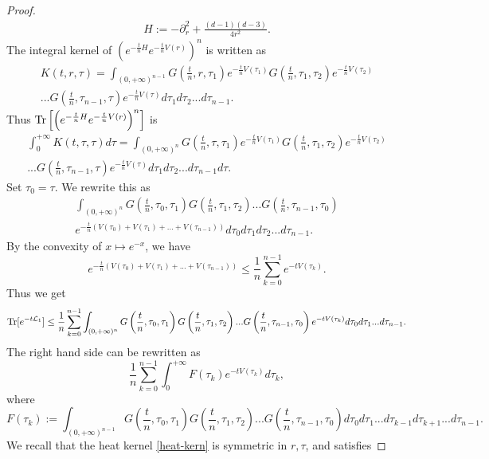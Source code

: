 \documentclass[%
11pt,  reqno]{amsart}
\theoremstyle{remarkstyle}
\newcommand{\1}{\hspace{0.2mm}\text{I}\hspace{0.2mm}}
\renewcommand{\L}{\mathcal{L}}
\numberwithin{equation}{section}
\numberwithin{theorem}{section}
\begin{document}
\begin{proof}
\begin{align}
			H:= -\partial^2_r +\frac{(d-1)(d-3)}{4r^2}.
		\end{align} 
		The integral kernel of $\left(e^{-\frac{t}{n}H} e^{-\frac{t}{n}V(r)}\right)^n$ is written as
		\begin{multline*}
			K(t,r,\tau) = \int_{(0,+\infty)^{n-1}} G\left(\frac{t}{n}, r, \tau_1\right) e^{-\frac{t}{n}V(\tau_1)} G\left(\frac{t}{n}, \tau_1, \tau_2\right)e^{-\frac{t}{n}V(\tau_2)}\\
			...G\left(\frac{t}{n}, \tau_{n-1}, \tau\right) e^{-\frac{t}{n}V(\tau)} d\tau_1 d\tau_2...d\tau_{n-1}.
		\end{multline*}
		Thus ${\rm Tr}\left[\left(e^{-\frac{t}{n}H} e^{-\frac{t}{n}V(r)}\right)^n\right]$ is
		\begin{multline*}
			\int_0^{+\infty} K(t, \tau, \tau) d\tau = \int_{(0,+\infty)^n} G\left(\frac{t}{n}, \tau, \tau_1\right) e^{-\frac{t}{n}V(\tau_1)} G\left(\frac{t}{n}, \tau_1, \tau_2\right)e^{-\frac{t}{n}V(\tau_2)}\\
			...G\left(\frac{t}{n}, \tau_{n-1}, \tau\right) e^{-\frac{t}{n}V(\tau)} d\tau_1 d\tau_2...d\tau_{n-1} d\tau.
		\end{multline*}
		Set $\tau_0=\tau$. We rewrite this as
		\begin{multline*}
			\int_{(0,+\infty)^n} G\left(\frac{t}{n}, \tau_0, \tau_1\right) G\left(\frac{t}{n}, \tau_1, \tau_2\right)...G\left(\frac{t}{n}, \tau_{n-1}, \tau_0\right) \\
			e^{-\frac{t}{n}\left(V(\tau_0)+V(\tau_1)+...+V(\tau_{n-1})\right)} d\tau_0d\tau_1 d\tau_2...d\tau_{n-1}.
		\end{multline*}
		By the convexity of $x \mapsto e^{-x}$, we have
		\[
		e^{-\frac{t}{n} \left(V(\tau_0)+V(\tau_1)+...+V(\tau_{n-1})\right)} \leq \frac{1}{n} \sum_{k=0}^{n-1} e^{-tV(\tau_k)}.
		\]
		Thus we get
		\begin{align*}
			{\rm Tr}[e^{-t\L_1}] \leq \frac{1}{n} \sum_{k=0}^{n-1} \int_{(0,+\infty)^n} G\left(\frac{t}{n}, \tau_0, \tau_1\right) G\left(\frac{t}{n}, \tau_1, \tau_2\right)...G\left(\frac{t}{n}, \tau_{n-1}, \tau_0\right) e^{-tV(\tau_k)} d\tau_0d\tau_1...d\tau_{n-1}.
		\end{align*}
		The right hand side can be rewritten as
		\[
		\frac{1}{n} \sum_{k=0}^{n-1} \int_0^{+\infty} F(\tau_k)e^{-tV(\tau_k)} d\tau_k,
		\]
		where
		\[
		F(\tau_k):=\int_{(0,+\infty)^{n-1}} G\left(\frac{t}{n}, \tau_0, \tau_1\right) G\left(\frac{t}{n}, \tau_1, \tau_2\right)...G\left(\frac{t}{n}, \tau_{n-1}, \tau_0\right) d\tau_0 d\tau_1...d\tau_{k-1} d\tau_{k+1}...d\tau_{n-1}.
		\]
		We recall that the heat kernel \eqref{heat-kern} is symmetric in $r, \tau$, and satisfies

\end{proof}
\end{document}
